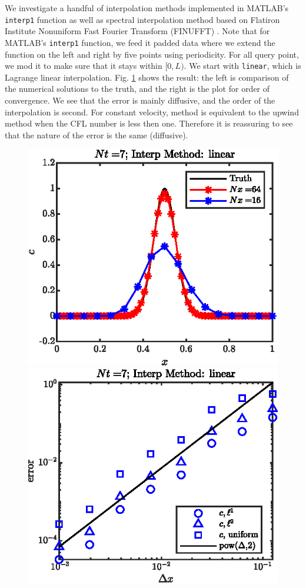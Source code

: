 \documentclass[11pt,letterpaper]{article}
\begin{document}
We investigate a handful of interpolation methods implemented in MATLAB's \texttt{interp1} function as well as spectral interpolation method based on Flatiron Institute Nonuniform Fast Fourier Transform (FINUFFT) \cite{finufft_1,finufft_2}. Note that for MATLAB's \texttt{interp1} function, we feed it padded data where we extend the function on the left and right by five points using periodicity. For all query point, we mod it to make sure that it stays within $[0,L)$. We start with \texttt{linear}, which is Lagrange linear interpolation. Fig. \ref{fig:1D_cons_linear_} shows the result: the left is comparison of the numerical solutions to the truth, and the right is the plot for order of convergence. We see that the error is mainly diffusive, and the order of the interpolation is second. For constant velocity, \sml\;method is equivalent to the upwind method when the CFL number is less then one. Therefore it is reassuring to see that the nature of the error is the same (diffusive).
\begin{figure}[H]
    \centering
    \includegraphics{figs/1D_cons_linear_sol}
    \includegraphics{figs/1D_cons_linear_convord}
    \caption{}\label{fig:1D_cons_linear_}
\end{figure}
\end{document}
